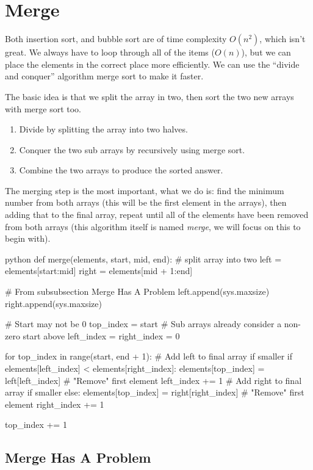 \section{Merge}\label{sec:merge}

Both insertion sort, and bubble sort are of time complexity \(O(n^2)\), which isn't great.
We always have to loop through all of the items (\(O(n)\)), but we can place the elements in the correct place more efficiently.
We can use the ``divide and conquer'' algorithm merge sort to make it faster.

The basic idea is that we split the array in two, then sort the two new arrays with merge sort too.
\begin{enumerate}
    \item Divide by splitting the array into two halves.
    \item Conquer the two sub arrays by recursively using merge sort.
    \item Combine the two arrays to produce the sorted answer.
\end{enumerate}
The merging step is the most important, what we do is: find the minimum number from both arrays (this will be the first element in the arrays), then adding that to the final array, repeat until all of the elements have been removed from both arrays (this algorithm itself is named \emph{merge}, we will focus on this to begin with).
\begin{code}{python}
def merge(elements, start, mid, end):
    # split array into two
    left = elements[start:mid]
    right = elements[mid + 1:end]

    # From subsubsection Merge Has A Problem
    left.append(sys.maxsize)
    right.append(sys.maxsize)

    # Start may not be 0
    top_index = start
    # Sub arrays already consider a non-zero start above
    left_index = right_index = 0

    for top_index in range(start, end + 1):
        # Add left to final array if smaller
        if elements[left_index] < elements[right_index]:
            elements[top_index] = left[left_index]
            # "Remove" first element
            left_index += 1
        # Add right to final array if smaller
        else:
            elements[top_index] = right[right_index]
            # "Remove" first element
            right_index += 1

        top_index += 1
\end{code}

\subsection{Merge Has A Problem}\label{sub:merge_has_a_problem}


